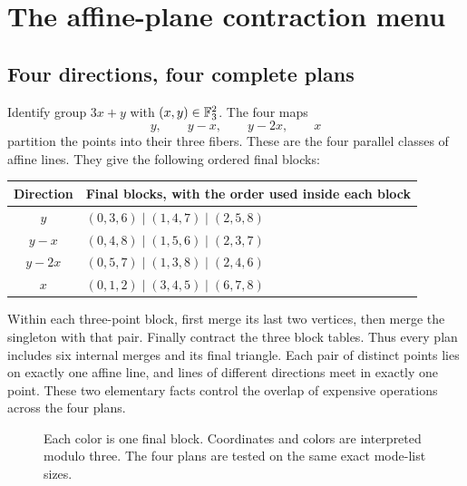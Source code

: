 \section{The affine-plane contraction menu}
\label{sec:geometry}

\subsection{Four directions, four complete plans}
Identify group $3x+y$ with $(x,y)\in\mathbb F_3^2$. The four maps
\[
 y,\qquad y-x,\qquad y-2x,\qquad x
\]
partition the points into their three fibers. These are the four parallel
classes of affine lines. They give the following ordered final blocks:
\begin{center}\small
\begin{tabular}{cl}
\toprule Direction & Final blocks, with the order used inside each block\\\midrule
$y$       & $(0,3,6)\mid(1,4,7)\mid(2,5,8)$\\
$y-x$     & $(0,4,8)\mid(1,5,6)\mid(2,3,7)$\\
$y-2x$    & $(0,5,7)\mid(1,3,8)\mid(2,4,6)$\\
$x$       & $(0,1,2)\mid(3,4,5)\mid(6,7,8)$\\
\bottomrule
\end{tabular}
\end{center}
Within each three-point block, first merge its last two vertices, then merge
the singleton with that pair. Finally contract the three block tables.
Thus every plan includes six internal merges and its final triangle.
Each pair of distinct points lies on exactly one affine line, and lines of
different directions meet in exactly one point. These two elementary facts
control the overlap of expensive operations across the four plans.

\begin{figure}[ht]
\centering
{}
\caption{Each color is one final block. Coordinates and colors are interpreted
modulo three. The four plans are tested on the same exact mode-list sizes.}
\label{fig:affine}
\end{figure}

